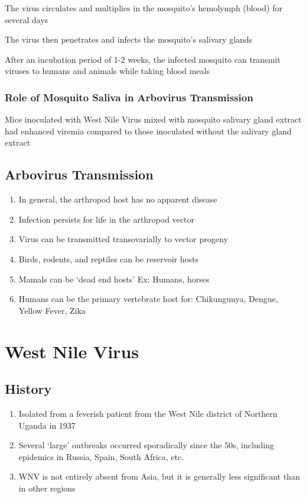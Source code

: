\documentclass{notes}
\begin{document}
The virus circulates and multiplies in the mosquito's hemolymph (blood) for several days

\tab The virus then penetrates and infects the mosquito's salivary glands

\tab After an incubation period of 1-2 weeks, the infected mosquito can transmit viruses to humans and animals while taking blood meals

\subsubsection{Role of Mosquito Saliva in Arbovirus Transmission}

Mice inoculated with West Nile Virus mixed with mosquito salivary gland extract had enhanced viremia compared to those inoculated without the salivary gland extract

\subsection{Arbovirus Transmission}

\begin{enumerate}
    \item In general, the arthropod host has no apparent disease
    \item Infection persists for life in the arthropod vector
    \item Virus can be transmitted transovarially to vector progeny
    \item Birds, rodents, and reptiles can be reservoir hosts
    \item Mamals can be `dead end hosts'
    \subitem Ex: Humans, horses
    \item Humans can be the primary vertebrate host for:
    \subitem Chikungunya, Dengue, Yellow Fever, Zika
\end{enumerate}

\section{West Nile Virus}

\subsection{History}

\begin{enumerate}
    \item Isolated from a feverish patient from the West Nile district of Northern Uganda in 1937
    \item Several `large' outbreaks occurred sporadically since the 50s, including epidemics in Russia, Spain, South Africa, etc.
    \item WNV is not entirely absent from Asia, but it is generally less significant than in other regions
\end{enumerate}
\end{document}
